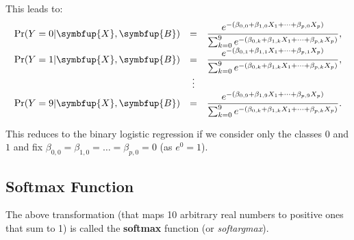\documentclass[10pt,b5paper,krantz1]{krantz}
\renewcommand{\mathbf}[1]{\symbfup{#1}}
\begin{document}
This leads to:
\[
\begin{array}{lcl}
\Pr(Y=0|\mathbf{X},\mathbf{B})&=&\displaystyle\frac{e^{-(\beta_{0,0} + \beta_{1,0} X_{1} +  \dots + \beta_{p,0} X_{p})}}{\sum_{k=0}^9 e^{-(\beta_{0,k} + \beta_{1,k} X_{1} +  \dots + \beta_{p,k} X_p)}},\\
\Pr(Y=1|\mathbf{X},\mathbf{B})&=&\displaystyle\frac{e^{-(\beta_{0,1} + \beta_{1,1} X_{1} +  \dots + \beta_{p,1} X_{p})}}{\sum_{k=0}^9 e^{-(\beta_{0,k} + \beta_{1,k} X_{1} +  \dots + \beta_{p,k} X_{p})}},\\
&\vdots&\\
\Pr(Y=9|\mathbf{X},\mathbf{B})&=&\displaystyle\frac{e^{-(\beta_{0,9} + \beta_{1,9} X_{1} +  \dots + \beta_{p,9} X_{p})}}{\sum_{k=0}^9 e^{-(\beta_{0,k} + \beta_{1,k} X_{1} +  \dots + \beta_{p,k} X_{p})}}.\\
\end{array}
\]

This reduces to the binary logistic regression
if we consider only the classes \(0\) and \(1\) and
fix \(\beta_{0,0}=\beta_{1,0}=\dots=\beta_{p,0}=0\) (as \(e^0=1\)).

\hypertarget{softmax-function}{%
\subsection{Softmax Function}\label{softmax-function}}

The above transformation (that maps 10 arbitrary real numbers
to positive ones that sum to 1)
is called the \textbf{softmax} function (or \emph{softargmax}).
\end{document}
